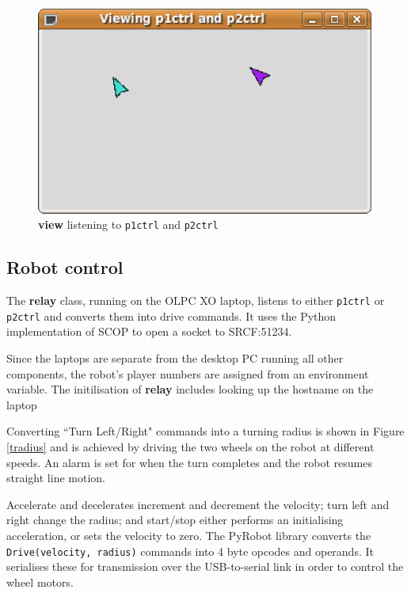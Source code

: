 \documentclass[12pt,a4,notitlepage]{report}
\renewcommand{\_}{\texttt{\symbol{95}}}
\newcommand{\<}{\texttt{\symbol{60}}}
\renewcommand{\>}{\texttt{\symbol{62}}}
\newcommand{\class}[1]{\textbf{#1}}
\newcommand{\scopendpoint}[1]{\texttt{#1}}
\newcommand{\variable}[1]{\texttt{#1}}
\begin{document}
\begin{itemize}
\begin{figure}[hb]
\centering
\includegraphics[scale=0.5,angle=0]{images/View.ps}
\caption{\class{view} listening to \scopendpoint{p1ctrl} and \scopendpoint{p2ctrl}}
\label{view}
\end{figure}

\end{itemize}

\subsection{Robot control}

The \class{relay} class, running on the OLPC XO laptop, listens to either \scopendpoint{p1ctrl} or \scopendpoint{p2ctrl} and converts them into drive commands. It uses the Python implementation of SCOP to open a socket to SRCF:51234. 

Since the laptops are separate from the desktop PC running all other components, the robot's player numbers are assigned from an environment variable. The initilisation of \class{relay} includes looking up the hostname on the laptop

Converting ``Turn Left/Right" commands into a turning radius is shown in Figure \ref{tradius} and is achieved by driving the two wheels on the robot at different speeds. An alarm is set for when the turn completes and the robot resumes straight line motion.

Accelerate and decelerates increment and decrement the velocity; turn left and right change the radius; and start/stop either performs an initialising acceleration, or sets the velocity to zero. The PyRobot library converts the \variable{Drive(velocity, radius)} commands into 4 byte opcodes and operands. It serialises these for transmission over the USB-to-serial link in order to control the wheel motors.
\end{document}
